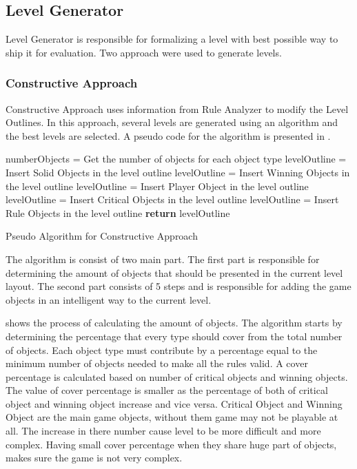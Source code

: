 \subsection{Level Generator}
Level Generator is responsible for formalizing a level with best possible way to ship it for evaluation. Two approach were used to generate levels.
\subsubsection{Constructive Approach}
Constructive Approach uses information from Rule Analyzer to modify the Level Outlines. In this approach, several levels are generated using an algorithm and the best levels are selected. A pseudo code for the algorithm is presented in .\\

\begin{algorithm}[H]  
	\BlankLine
	numberObjects = Get the number of objects for each object type\;
	\BlankLine
	levelOutline = Insert Solid Objects in the level outline\;
	levelOutline = Insert Winning Objects in the level outline\;
	levelOutline = Insert Player Object in the level outline\;
	levelOutline = Insert Critical Objects in the level outline\;
	levelOutline = Insert Rule Objects in the level outline\;
	\BlankLine
	\textbf{return} levelOutline\;
	\caption{Pseudo Algorithm for Constructive Approach}
	\label{Algorithm:constructiveApproach}
\end{algorithm}
The algorithm is consist of two main part. The first part is responsible for determining the amount of objects that should be presented in the current level layout. The second part consists of 5 steps and is responsible for adding the game objects in an intelligent way to the current level.\\\par

 shows the process of calculating the amount of objects. The algorithm starts by determining the percentage that every type should cover from the total number of objects. Each object type must contribute by a percentage equal to the minimum number of objects needed to make all the rules valid. A cover percentage is calculated based on number of critical objects and winning objects. The value of cover percentage is smaller as the percentage of both of critical object and winning object increase and vice versa. Critical Object and Winning Object are the main game objects, without them game may not be playable at all. The increase in there number cause level to be more difficult and more complex. Having small cover percentage when they share huge part of objects, makes sure the game is not very complex.\\

